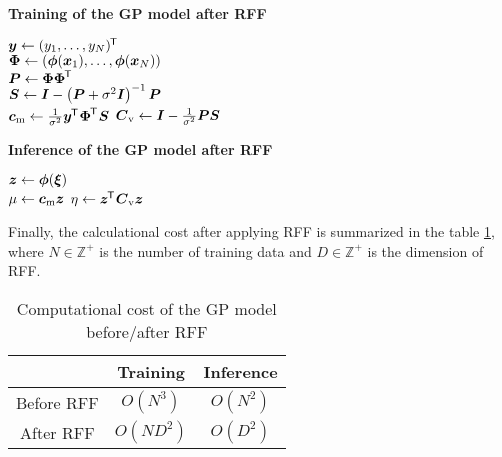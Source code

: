 \documentclass[twocolumn,a4paper,10pt]{article}
\begin{document}
\begin{algorithm}[t]
    \caption{\bf Training of the GP model after RFF}
    \label{alg:rffgp_train}
    $\boldsymbol{y} \gets (y_1, \ldots, y_N)^{\mkern-1.5mu\mathsf{T}}\hspace{0.5pt}$ \\
    $\boldsymbol{\Phi} \gets (\boldsymbol{\phi}(\boldsymbol{x}_1), \ldots, \boldsymbol{\phi}(\boldsymbol{x}_N))$ \\
    $\boldsymbol{P} \gets \boldsymbol{\Phi\Phi}^{\mkern-1.5mu\mathsf{T}}\hspace{0.5pt}$ \\
    $\boldsymbol{S} \gets \boldsymbol{I} - \left( \boldsymbol{P} + \sigma^2 \boldsymbol{I} \right)^{-1} \boldsymbol{P}$ \\
    $\boldsymbol{c}_\mathrm{m} \gets \frac{1}{\sigma^2} \boldsymbol{y}^{\mkern-1.5mu\mathsf{T}}\hspace{0.5pt} \boldsymbol{\Phi}^{\mkern-1.5mu\mathsf{T}}\hspace{0.5pt} \boldsymbol{S}$
    \hfill{}
    $\boldsymbol{C}_\mathrm{v} \gets \boldsymbol{I} - \frac{1}{\sigma^2} \boldsymbol{PS}$
    \hfill{}
\end{algorithm}

\begin{algorithm}[t]
    \caption{\bf Inference of the GP model after RFF}
    \label{alg:rffgp_infer}
    $\boldsymbol{z} \gets \boldsymbol{\phi}(\boldsymbol{\xi})$ \\
    $\mu \gets \boldsymbol{c}_\mathrm{m} \boldsymbol{z}$
    \hfill{}
    $\eta \gets \boldsymbol{z}^{\mkern-1.5mu\mathsf{T}}\hspace{0.5pt} \boldsymbol{C}_\mathrm{v} \boldsymbol{z}$
    \hfill{}
\end{algorithm}

Finally, the calculational cost after applying RFF is summarized in the table
\ref{tab:gp_complexity}, where $N \in \mathbb{Z}^{+}$ is the number of training data
and $D \in \mathbb{Z}^{+}$ is the dimension of RFF.

\begin{table}[t]
    \caption{Computational cost of the GP model before/after RFF}
    \label{tab:gp_complexity}
    \begin{center}\begin{tabular}{ccc}
        \hline
         & Training & Inference \\
        \hline
        Before RFF & $O(N^3)$   & $O(N^2)$ \\  
        After RFF  & $O(N D^2)$ & $O(D^2)$ \\
        \hline
    \end{tabular}\end{center}
\end{table}
\end{document}
